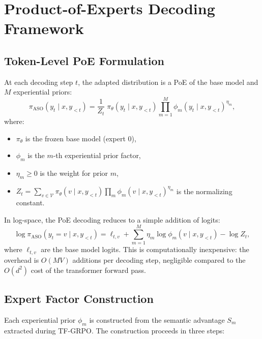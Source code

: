 \documentclass[11pt]{article}
\begin{document}
\section{Product-of-Experts Decoding Framework}
\label{sec:poe}

\subsection{Token-Level PoE Formulation}

At each decoding step $t$, the adapted distribution is a PoE of the base model
and $M$ experiential priors:
\begin{equation}
    \pi_{\text{ASO}}(y_t \mid x, y_{<t})
    = \frac{1}{Z_t} \; \pi_\theta(y_t \mid x, y_{<t})
    \prod_{m=1}^{M} \phi_m(y_t \mid x, y_{<t})^{\eta_m},
    \label{eq:poe-main}
\end{equation}
where:
\begin{itemize}[leftmargin=1.5em]
    \item $\pi_\theta$ is the frozen base model (expert 0),
    \item $\phi_m$ is the $m$-th experiential prior factor,
    \item $\eta_m \geq 0$ is the weight for prior $m$,
    \item $Z_t = \sum_{v \in \mathcal{V}} \pi_\theta(v \mid x, y_{<t})
          \prod_m \phi_m(v \mid x, y_{<t})^{\eta_m}$ is the normalizing constant.
\end{itemize}

In log-space, the PoE decoding reduces to a simple addition of logits:
\begin{equation}
    \log \pi_{\text{ASO}}(y_t = v \mid x, y_{<t})
    = \ell_{t,v} + \sum_{m=1}^{M} \eta_m \log \phi_m(v \mid x, y_{<t}) - \log Z_t,
    \label{eq:poe-logspace}
\end{equation}
where $\ell_{t,v}$ are the base model logits. This is computationally
inexpensive: the overhead is $O(MV)$ additions per decoding step, negligible
compared to the $O(d^2)$ cost of the transformer forward pass.

\subsection{Expert Factor Construction}

Each experiential prior $\phi_m$ is constructed from the semantic advantage
$S_m$ extracted during TF-GRPO. The construction proceeds in three steps:
\end{document}

